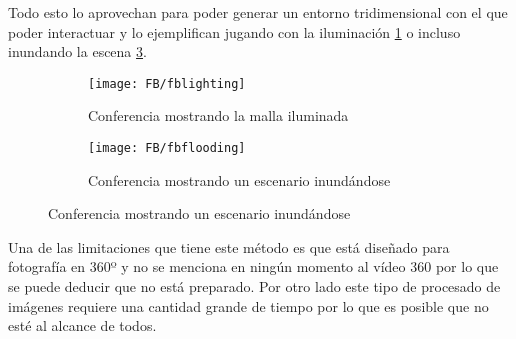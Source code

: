 Todo esto lo aprovechan para poder generar un entorno tridimensional con el que poder interactuar y lo ejemplifican jugando con la iluminación \ref{fig:fblighting-example} o incluso inundando la escena \ref{fig:fbflooding-example}.

\begin{figure}[h]
\centering
\begin{subfigure}{.5\linewidth}
	\centering
	\texttt{[image: FB/fblighting]}
  \caption{Conferencia mostrando la malla iluminada}
  \label{fig:fblighting-example}
\end{subfigure}%
\begin{subfigure}{.5\linewidth}
	\centering
	\texttt{[image: FB/fbflooding]}
  \caption{Conferencia mostrando un escenario inundándose}
  \label{fig:fbflooding-example}
\end{subfigure}
\end{figure}

Una de las limitaciones que tiene este método es que está diseñado para fotografía en 360º y no se menciona en ningún momento al vídeo 360 por lo que se puede deducir que no está preparado. Por otro lado este tipo de procesado de imágenes requiere una cantidad grande de tiempo por lo que es posible que no esté al alcance de todos.


